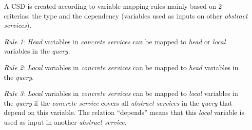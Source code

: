 A CSD is created according to variable mapping rules mainly based on 2 criterias: the type and the dependency (variables used as inputs on other \textit{abstract services}). 
\begin{description}
\item \textit{Rule 1}: \textit{Head} variables in \textit{concrete services} can be mapped to \textit{head} or \textit{local} variables in the \textit{query}.
\item \textit{Rule 2}: \textit{Local} variables in \textit{concrete services} can be mapped to \textit{head} variables in the \textit{query}.
\item \textit{Rule 3}: \textit{Local} variables in \textit{concrete services} can be mapped to \textit{local}
 variables in the \textit{query} if the \textit{concrete service} covers all \textit{abstract services} in the \textit{query} that depend on this variable. The relation ``depends''  means that this \textit{local} variable is used as input in another \textit{abstract service}. 
\end{description}